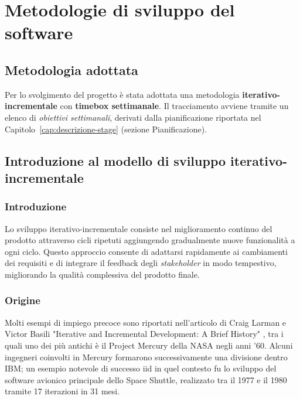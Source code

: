 \chapter{Metodologie di sviluppo del software}
\label{cap:processi-metodologie}


\section{Metodologia adottata}
\label{sec:metodologia-adottata}

Per lo svolgimento del progetto è stata adottata una metodologia \textbf{iterativo-incrementale} con \textbf{timebox settimanale}. Il tracciamento avviene tramite un elenco di \emph{obiettivi settimanali}, derivati dalla pianificazione riportata nel Capitolo~\ref{cap:descrizione-stage} (sezione Pianificazione).
\section{Introduzione al modello di sviluppo iterativo-incrementale}
\subsection{Introduzione}
Lo sviluppo iterativo-incrementale consiste nel miglioramento continuo del prodotto attraverso cicli ripetuti aggiungendo gradualmente nuove funzionalità a ogni ciclo. Questo approccio consente di adattarsi rapidamente ai cambiamenti dei requisiti e di integrare il feedback degli \emph{stakeholder} in modo tempestivo, migliorando la qualità complessiva del prodotto finale.
\subsection{Origine}
Molti esempi di impiego precoce sono riportati nell'articolo di Craig Larman e Victor Basili "Iterative and Incremental Development: A Brief History" \cite{LarmanBasili2003}, tra i quali uno dei più antichi è il Project Mercury della NASA negli anni '60. Alcuni ingegneri coinvolti in Mercury formarono successivamente una divisione dentro IBM; un esempio notevole di successo \gls{iid} in quel contesto fu lo sviluppo del software avionico principale dello Space Shuttle, realizzato tra il 1977 e il 1980 tramite 17 iterazioni in 31 mesi.

